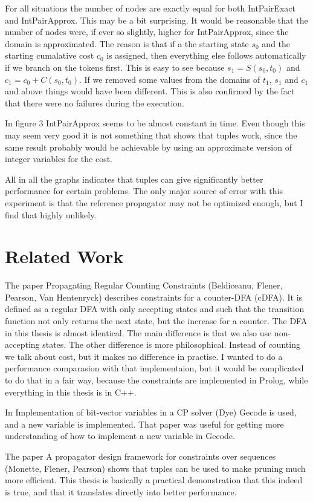 \documentclass[a4paper,11pt]{article}
\begin{document}
For all situations the number of nodes are exactly equal for both IntPairExact and IntPairApprox. This may be a bit surprising. It would be reasonable that the number of nodes were, if ever so slightly, higher for IntPairApprox, since the domain is approximated. The reason is that if a the starting state $s_0$ and the starting cumalative cost $c_0$ is assigned, then everything else follows automatically if we branch on the tokens first. This is easy to see because $s_1=S(s_0, t_0)$ and $c_1=c_0+C(s_0, t_0)$. If we removed some values from the domains of $t_1$, $s_1$ and $c_1$ and above things would have been different. This is also confirmed by the fact that there were no failures during the execution.

In figure 3 IntPairApprox seems to be almost constant in time. Even though this may seem very good it is not something that shows that tuples work, since the same result probably would be achievable by using an approximate version of integer variables for the cost.

All in all the graphs indicates that tuples can give significantly better performance for certain problems. The only major source of error with this experiment is that the reference propagator may not be optimized enough, but I find that highly unlikely.

\section{Related Work}
The paper Propagating Regular Counting Constraints (Beldiceanu, Flener, Pearson, Van Hentenryck) describes constraints for a counter-DFA (cDFA). It is defined as a regular DFA with only accepting states and such that the transition function not only returns the next state, but the increase for a counter. The DFA in this thesis is almost identical. The main difference is that we also use non-accepting states. The other difference is more philosophical. Instead of counting we talk about cost, but it makes no difference in practise. I wanted to do a performance comparasion with that implementaion, but it would be complicated to do that in a fair way, because the constraints are implemented in Prolog, while everything in this thesis is in C++.

In Implementation of bit-vector variables in a CP solver (Dye) Gecode is used, and a new variable is implemented. That paper was useful for getting more understanding of how to implement a new variable in Gecode.

The paper A propagator design framework for constraints over sequences (Monette, Flener, Pearson) shows that tuples can be used to make pruning much more efficient. This thesis is basically a practical demonstration that this indeed is true, and that it translates directly into better performance.
\end{document}
